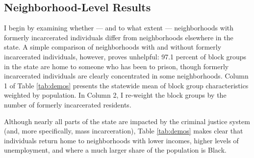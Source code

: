 \documentclass[
  12pt,
]{article}
\begin{document}
\hypertarget{neighborhood-level-results}{%
\subsection*{Neighborhood-Level Results}\label{neighborhood-level-results}}

I begin by examining whether --- and to what extent --- neighborhoods with formerly incarcerated individuals differ from neighborhoods elsewhere in the state. A simple comparison of neighborhoods with and without formerly incarcerated individuals, however, proves unhelpful: 97.1 percent of block groups in the state are home to someone who has been to prison, though formerly incarcerated individuals are clearly concentrated in some neighborhoods. Column 1 of Table \ref{tab:demos} presents the statewide mean of block group characteristics weighted by population. In Column 2, I re-weight the block groups by the number of formerly incarcerated residents.



Although nearly all parts of the state are impacted by the criminal justice system (and, more specifically, mass incarceration), Table \ref{tab:demos} makes clear that individuals return home to neighborhoods with lower incomes, higher levels of unemployment, and where a much larger share of the population is Black.
\end{document}
